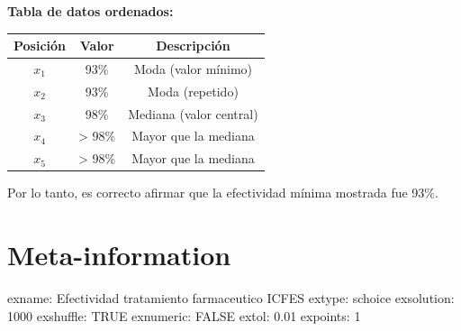 \documentclass[
]{article}
\begin{document}
\textbf{Tabla de datos ordenados:}

\begin{longtable}[]{@{}ccc@{}}
\toprule\noalign{}
Posición & Valor & Descripción \\
\midrule\noalign{}
\endhead
\bottomrule\noalign{}
\endlastfoot
\(x_1\) & 93\% & Moda (valor mínimo) \\
\(x_2\) & 93\% & Moda (repetido) \\
\(x_3\) & 98\% & Mediana (valor central) \\
\(x_4\) & \textgreater{} 98\% & Mayor que la mediana \\
\(x_5\) & \textgreater{} 98\% & Mayor que la mediana \\
\end{longtable}

Por lo tanto, es correcto afirmar que la efectividad mínima mostrada fue
93\%.

\section{Meta-information}\label{meta-information}

exname: Efectividad tratamiento farmaceutico ICFES extype: schoice
exsolution: 1000 exshuffle: TRUE exnumeric: FALSE extol: 0.01 expoints:
1
\end{document}
